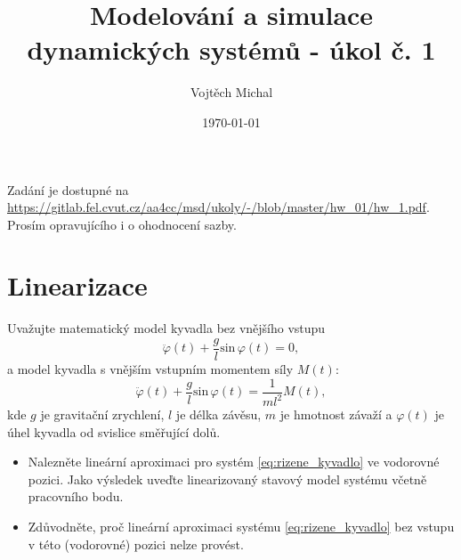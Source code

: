 \documentclass[twoside]{article}
\title{Modelování a simulace dynamických systémů - úkol č. 1}
\author{Vojtěch Michal}
\date{\today}
\begin{document}
\maketitle

Zadání je dostupné na \url{https://gitlab.fel.cvut.cz/aa4cc/msd/ukoly/-/blob/master/hw_01/hw_1.pdf}. \\
Prosím opravujícího i o ohodnocení sazby.
\section{Linearizace}

Uvažujte matematický model kyvadla bez vnějšího vstupu
\begin{equation}
	\ddot{\varphi}(t) + \frac{g}{l} \text{sin}\,\varphi(t) = 0,
	\label{eq:nerizene_kyvadlo}
\end{equation}
a model kyvadla s vnějším vstupním momentem síly $M(t)$:
\begin{equation}
	\ddot{\varphi}(t) + \frac{g}{l} \text{sin}\,\varphi(t) = \frac{1}{ml^2} M(t),
	\label{eq:rizene_kyvadlo}
\end{equation}
kde $g$ je gravitační zrychlení, $l$ je délka závěsu, $m$ je hmotnost závaží a $\varphi(t)$ je úhel kyvadla od svislice směřující dolů.
\begin{itemize}
	\item Nalezněte lineární aproximaci pro systém \eqref{eq:rizene_kyvadlo} ve vodorovné pozici. Jako výsledek uveďte linearizovaný stavový
	model systému včetně pracovního bodu.
	\item Zdůvodněte, proč lineární aproximaci systému \eqref{eq:rizene_kyvadlo} bez vstupu v této (vodorovné) pozici nelze provést.
\end{itemize}
\end{document}
